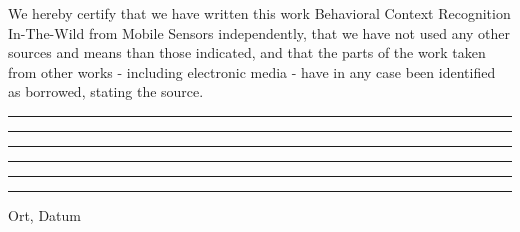\documentclass[a4paper,12pt]{scrartcl}
\begin{document}
\normalsize
\vspace{25mm}
We hereby certify that we have written this work \grqq Behavioral Context Recognition In-The-Wild from Mobile Sensors\grqq{} independently, that we have not used any other sources and means than those indicated, and that the parts of the work taken from other works - including electronic media - have in any case been identified as borrowed, stating the source.\\
	
	
	
	


\begin{center}
	\rule{6cm}{.5pt} \hspace{3cm} \rule{6cm}{.5pt}
\end{center}
\vspace{1cm}
\begin{center}
	\rule{6cm}{.5pt} \hspace{3cm} \rule{6cm}{.5pt}
\end{center}

\vspace{3cm}
	\begin{center}
	\rule{6cm}{.5pt} \hspace{3cm} \rule{6cm}{0pt}
\end{center}	
\vspace{-5mm}
\hspace*{25mm} Ort, Datum	
\end{document}
